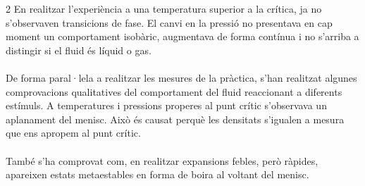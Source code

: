 \documentclass[12pt,twosides,onecolumn,openany]{article}
\begin{document}
\begin{multicols}{2}
En realitzar l'experiència a una temperatura superior a la crítica, ja no s'observaven transicions de fase. El canvi en la pressió no presentava en cap moment un comportament isobàric, augmentava de forma contínua i no s'arriba a distingir si el fluid és líquid o gas.\\\\
De forma paral·lela a realitzar les mesures de la pràctica, s'han realitzat algunes comprovacions qualitatives del comportament del fluid reaccionant a diferents estímuls. A temperatures i pressions properes al punt crític s'observava un aplanament del menisc. Això és causat perquè les densitats s'igualen a mesura que ens apropem al punt crític.\\\\
També s'ha comprovat com, en realitzar expansions febles, però ràpides, apareixen estats metaestables en forma de boira al voltant del menisc.

\end{multicols}
\end{document}
